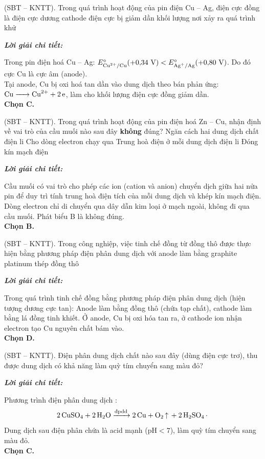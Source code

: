 \documentclass[11pt,a4paper]{article}
\def\loigiai#1{
\par\begingroup\color{blue!80!black}\small
\noindent\textbf{\textit{Lời giải chi tiết:}}\par
#1\par\endgroup}
\begin{document}
\begin{ex}
(SBT – KNTT). Trong quá trình hoạt động của pin điện Cu -- Ag, điện cực đồng là
\choice
{điện cực dương}
{cathode}
{\True điện cực bị giảm dần khối lượng}
{nơi xảy ra quá trình khử}
\loigiai{
Trong pin điện hoá Cu -- Ag: $E^\circ_{\ce{Cu^2+/Cu}} (+0{,}34\text{ V}) < E^\circ_{\ce{Ag+/Ag}} (+0{,}80\text{ V})$. Do đó cực Cu là cực âm (anode).\\
Tại anode, Cu bị oxi hoá tan dần vào dung dịch theo bán phản ứng: $\ce{Cu -> Cu^2+ + 2e}$, làm cho khối lượng điện cực đồng giảm dần.\\
\textbf{Chọn C.}}
\end{ex}

\begin{ex}
(SBT – KNTT). Trong quá trình hoạt động của pin điện hoá Zn -- Cu, nhận định về vai trò của cầu muối nào sau đây \textbf{không} đúng?
\choice
{Ngăn cách hai dung dịch chất điện li}
{\True Cho dòng electron chạy qua}
{Trung hoà điện ở mỗi dung dịch điện li}
{Đóng kín mạch điện}
\loigiai{
Cầu muối có vai trò cho phép các ion (cation và anion) chuyển dịch giữa hai nửa pin để duy trì tính trung hoà điện tích của mỗi dung dịch và khép kín mạch điện.\\
Dòng electron chỉ di chuyển qua dây dẫn kim loại ở mạch ngoài, không đi qua cầu muối. Phát biểu B là không đúng.\\
\textbf{Chọn B.}}
\end{ex}

\begin{ex}
(SBT – KNTT). Trong công nghiệp, việc tinh chế đồng từ đồng thô được thực hiện bằng phương pháp điện phân dung dịch với anode làm bằng
\choice
{graphite}
{platinum}
{thép}
{\True đồng thô}
\loigiai{
Trong quá trình tinh chế đồng bằng phương pháp điện phân dung dịch \ce{CuSO4} (hiện tượng dương cực tan): Anode làm bằng đồng thô (chứa tạp chất), cathode làm bằng lá đồng tinh khiết. Ở anode, Cu bị oxi hóa tan ra, ở cathode ion \ce{Cu^2+} nhận electron tạo Cu nguyên chất bám vào.\\
\textbf{Chọn D.}}
\end{ex}

\begin{ex}
(SBT – KNTT). Điện phân dung dịch chất nào sau đây (dùng điện cực trơ), thu được dung dịch có khả năng làm quỳ tím chuyển sang màu đỏ?
\choice
{}
{}
{\True {}}
{}
\loigiai{
Phương trình điện phân dung dịch \ce{CuSO4}:
$$\ce{2CuSO4 + 2H2O ->[\text{đpdd}] 2Cu + O2 ^ + 2H2SO4.}$$
Dung dịch sau điện phân chứa \ce{H2SO4} là acid mạnh ($\text{pH} < 7$), làm quỳ tím chuyển sang màu đỏ.\\
\textbf{Chọn C.}}
\end{ex}
\end{document}
